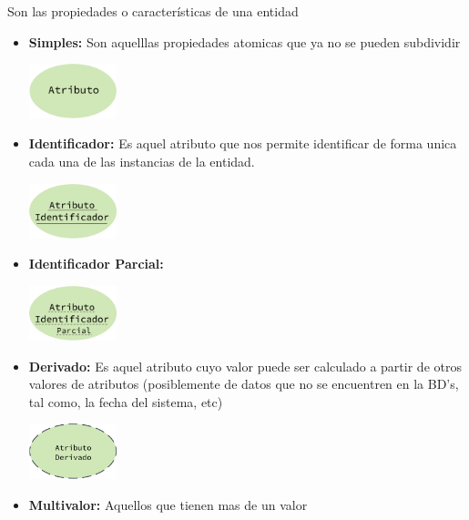 \documentclass[12pt, fleqn]{report}                             %
\begin{document}
            Son las propiedades o características de una entidad
            \begin{itemize}

                \item \textbf{Simples:}
                    Son aquelllas propiedades atomicas que ya no se pueden subdividir
                    
                    \includegraphics[width=0.20\textwidth]{Atributo}

                \item \textbf{Identificador:}
                    Es aquel atributo que nos permite identificar de forma unica cada una de las
                    instancias de la entidad.

                    \includegraphics[width=0.20\textwidth]{AtributoID}

                \item \textbf{Identificador Parcial:}

                    \includegraphics[width=0.20\textwidth]{AtributoIDParcial}

                \item \textbf{Derivado:}
                    Es aquel atributo cuyo valor puede ser calculado a partir de
                    otros valores de atributos (posiblemente de datos que no se
                    encuentren en la BD's, tal como, la fecha del sistema, etc)

                    \includegraphics[width=0.20\textwidth]{AtributoDerivado}

                \item \textbf{Multivalor:}
                    Aquellos que tienen mas de un valor


\end{itemize}
\end{document}
